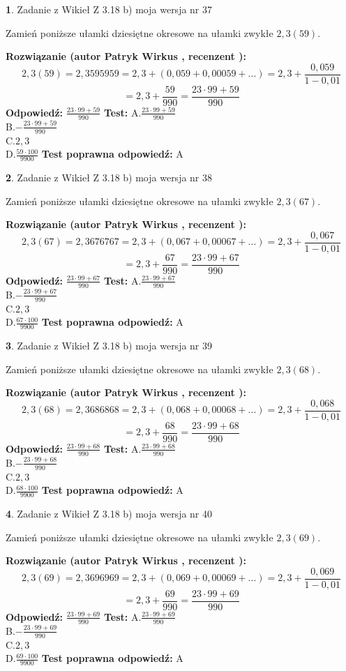 \documentclass[12pt, a4paper]{article}
\theoremstyle{definition} %
\newtheorem{zad}{}
\newcommand{\zadStart}[1]{\begin{zad}#1\newline}
\newcommand{\zadStop}{\end{zad}}
\newcommand{\rozwStart}[2]{\noindent \textbf{Rozwiązanie (autor #1 , recenzent #2): }\newline}
\newcommand{\rozwStop}{\newline}
\newcommand{\odpStart}{\noindent \textbf{Odpowiedź:}\newline}
\newcommand{\odpStop}{\newline}
\newcommand{\testStart}{\noindent \textbf{Test:}\newline}
\newcommand{\testStop}{\newline}
\newcommand{\kluczStart}{\noindent \textbf{Test poprawna odpowiedź:}\newline}
\newcommand{\kluczStop}{\newline}
\begin{document}
\zadStart{Zadanie z Wikieł Z 3.18 b) moja wersja nr 37}

Zamień poniższe ułamki dziesiętne okresowe na ułamki zwykłe $2,3(59)$.
\zadStop
\rozwStart{Patryk Wirkus}{}
$$2,3(59)=2,3595959=2,3+(0,059+0,00059+...)=2,3+\frac{0,059}{1-0,01}$$
$$=2,3+\frac{59}{990}=\frac{23\cdot99+59}{990}$$
\rozwStop
\odpStart
$\frac{23\cdot99+59}{990}$
\odpStop
\testStart
A.$\frac{23\cdot99+59}{990}$\\ B.$-\frac{23\cdot99+59}{990}$\\ C.$2,3$\\ D.$\frac{59\cdot100}{9900}$
\testStop
\kluczStart
A
\kluczStop



\zadStart{Zadanie z Wikieł Z 3.18 b) moja wersja nr 38}

Zamień poniższe ułamki dziesiętne okresowe na ułamki zwykłe $2,3(67)$.
\zadStop
\rozwStart{Patryk Wirkus}{}
$$2,3(67)=2,3676767=2,3+(0,067+0,00067+...)=2,3+\frac{0,067}{1-0,01}$$
$$=2,3+\frac{67}{990}=\frac{23\cdot99+67}{990}$$
\rozwStop
\odpStart
$\frac{23\cdot99+67}{990}$
\odpStop
\testStart
A.$\frac{23\cdot99+67}{990}$\\ B.$-\frac{23\cdot99+67}{990}$\\ C.$2,3$\\ D.$\frac{67\cdot100}{9900}$
\testStop
\kluczStart
A
\kluczStop



\zadStart{Zadanie z Wikieł Z 3.18 b) moja wersja nr 39}

Zamień poniższe ułamki dziesiętne okresowe na ułamki zwykłe $2,3(68)$.
\zadStop
\rozwStart{Patryk Wirkus}{}
$$2,3(68)=2,3686868=2,3+(0,068+0,00068+...)=2,3+\frac{0,068}{1-0,01}$$
$$=2,3+\frac{68}{990}=\frac{23\cdot99+68}{990}$$
\rozwStop
\odpStart
$\frac{23\cdot99+68}{990}$
\odpStop
\testStart
A.$\frac{23\cdot99+68}{990}$\\ B.$-\frac{23\cdot99+68}{990}$\\ C.$2,3$\\ D.$\frac{68\cdot100}{9900}$
\testStop
\kluczStart
A
\kluczStop



\zadStart{Zadanie z Wikieł Z 3.18 b) moja wersja nr 40}

Zamień poniższe ułamki dziesiętne okresowe na ułamki zwykłe $2,3(69)$.
\zadStop
\rozwStart{Patryk Wirkus}{}
$$2,3(69)=2,3696969=2,3+(0,069+0,00069+...)=2,3+\frac{0,069}{1-0,01}$$
$$=2,3+\frac{69}{990}=\frac{23\cdot99+69}{990}$$
\rozwStop
\odpStart
$\frac{23\cdot99+69}{990}$
\odpStop
\testStart
A.$\frac{23\cdot99+69}{990}$\\ B.$-\frac{23\cdot99+69}{990}$\\ C.$2,3$\\ D.$\frac{69\cdot100}{9900}$
\testStop
\kluczStart
A
\kluczStop
\end{document}
